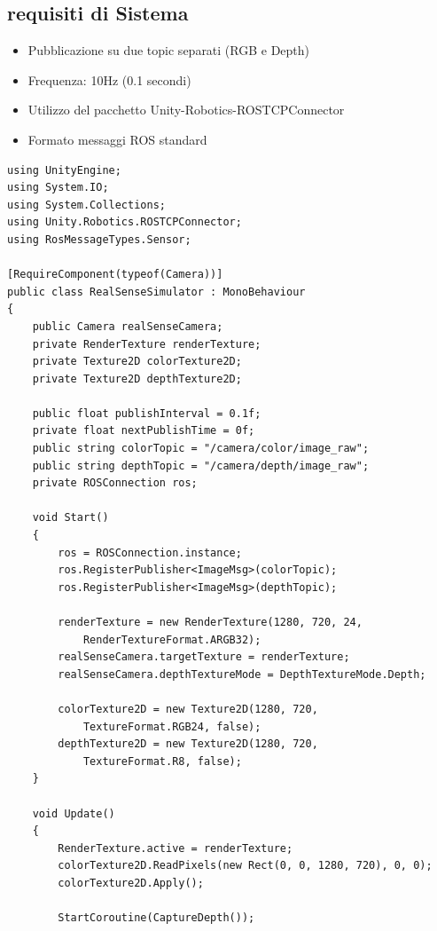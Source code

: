 \documentclass[11pt]{report}
\begin{document}
\subsection{requisiti di Sistema}
\begin{itemize}
\item Pubblicazione su due topic separati (RGB e Depth)
\item Frequenza: 10Hz (0.1 secondi)
\item Utilizzo del pacchetto Unity-Robotics-ROSTCPConnector
\item Formato messaggi ROS standard
\end{itemize}
\vspace{-1em} %
\begin{lstlisting}[caption=Integrazione dello script di Ros2, label=lst:base, lineskip=0.3em]
using UnityEngine;
using System.IO;
using System.Collections;
using Unity.Robotics.ROSTCPConnector;
using RosMessageTypes.Sensor;

[RequireComponent(typeof(Camera))]
public class RealSenseSimulator : MonoBehaviour
{
    public Camera realSenseCamera;
    private RenderTexture renderTexture;
    private Texture2D colorTexture2D;
    private Texture2D depthTexture2D;
    
    public float publishInterval = 0.1f;
    private float nextPublishTime = 0f;
    public string colorTopic = "/camera/color/image_raw";
    public string depthTopic = "/camera/depth/image_raw";
    private ROSConnection ros;

    void Start()
    {
        ros = ROSConnection.instance;
        ros.RegisterPublisher<ImageMsg>(colorTopic);
        ros.RegisterPublisher<ImageMsg>(depthTopic);

        renderTexture = new RenderTexture(1280, 720, 24, 
            RenderTextureFormat.ARGB32);
        realSenseCamera.targetTexture = renderTexture;
        realSenseCamera.depthTextureMode = DepthTextureMode.Depth;
        
        colorTexture2D = new Texture2D(1280, 720, 
            TextureFormat.RGB24, false);
        depthTexture2D = new Texture2D(1280, 720, 
            TextureFormat.R8, false);
    }

    void Update()
    {
        RenderTexture.active = renderTexture;
        colorTexture2D.ReadPixels(new Rect(0, 0, 1280, 720), 0, 0);
        colorTexture2D.Apply();
        
        StartCoroutine(CaptureDepth());


\end{lstlisting}
\end{document}

